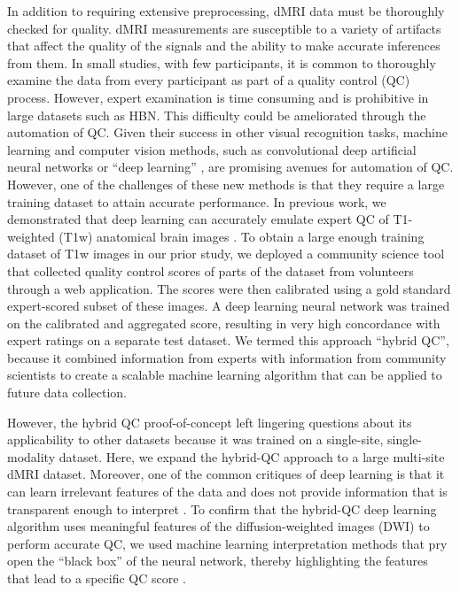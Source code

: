\documentclass[fleqn,10pt,inline]{wlscirep}
\begin{document}
In addition to requiring extensive preprocessing, dMRI data must be thoroughly checked for quality. dMRI measurements are susceptible to a variety of artifacts that affect
the quality of the signals and the ability to make accurate inferences from
them. In small studies, with few participants, it is common to thoroughly
examine the data from every participant as part of a quality control (QC)
process. However, expert examination is time consuming and is prohibitive in large
datasets such as HBN. This difficulty could be ameliorated through the
automation of QC. Given their success in other visual recognition tasks, machine learning and computer vision methods, such as convolutional deep
artificial neural networks or ``deep learning'' \cite{lecun2015deep}, are
promising avenues for automation of QC. However, one of the challenges of these new
methods is that they require a large training dataset to attain accurate
performance. In previous work, we demonstrated that deep learning can accurately
emulate expert QC of T1-weighted (T1w) anatomical brain images
\cite{keshavan2019-er}. To obtain a large enough training dataset of T1w images
in our prior study, we deployed a community science tool
that collected quality
control scores of parts of the dataset from volunteers through a web application.
The scores were then calibrated using a gold standard expert-scored subset of
these images. A deep learning neural network was trained on the calibrated and
aggregated score, resulting in very high concordance with expert ratings on a
separate test dataset. We termed this approach ``hybrid QC'', because it combined
information from experts with information from community scientists to create a
scalable machine learning algorithm that can be applied to future data
collection.

However, the hybrid QC proof-of-concept left lingering questions about its
applicability to other datasets because it was trained on a single-site,
single-modality dataset. Here, we expand the hybrid-QC approach to a large
multi-site dMRI dataset. Moreover, one of the common critiques of deep
learning is that it can learn irrelevant features of the data and does not
provide information that is transparent enough to interpret
\cite{lipton2017doctor, salahuddin2022transparency, Zech2018-ki}. To confirm
that the hybrid-QC deep learning algorithm uses meaningful features of the
diffusion-weighted images (DWI) to perform accurate QC, we used machine learning
interpretation methods that pry open the ``black box'' of the neural network, thereby
highlighting the features that lead to a specific QC score
\cite{sundararajan2017axiomatic, murdoch2019definitions}.
\end{document}
